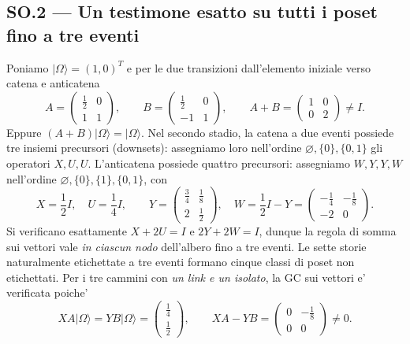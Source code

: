 \documentclass[11pt,a4paper]{article}
\begin{document}
\subsection*{SO.2 --- Un testimone esatto su tutti i poset fino a tre eventi}
Poniamo $|\Omega\rangle=(1,0)^{T}$ e per le due transizioni dall'elemento iniziale verso catena e anticatena
\begin{equation}
A=\begin{pmatrix}\tfrac12&0\\1&1\end{pmatrix},\qquad
B=\begin{pmatrix}\tfrac12&0\\-1&1\end{pmatrix},\qquad
A+B=\begin{pmatrix}1&0\\0&2\end{pmatrix}\ne I.\tag{SO.2}
\end{equation}
Eppure $(A+B)|\Omega\rangle=|\Omega\rangle$. Nel secondo stadio, la catena a due eventi possiede tre insiemi precursori (downsets): assegniamo loro nell'ordine $\varnothing,\{0\},\{0,1\}$ gli operatori $X,U,U$. L'anticatena possiede quattro precursori: assegniamo $W,Y,Y,W$ nell'ordine $\varnothing,\{0\},\{1\},\{0,1\}$, con
\begin{equation}
X=\frac12 I,\quad U=\frac14 I,\qquad
Y=\begin{pmatrix}\tfrac34&\tfrac18\\2&\tfrac12\end{pmatrix},\quad
W=\frac12 I-Y=\begin{pmatrix}-\tfrac14&-\tfrac18\\-2&0\end{pmatrix}.\tag{SO.3}
\end{equation}
Si verificano esattamente $X+2U=I$ e $2Y+2W=I$, dunque la regola di somma sui vettori vale \emph{in ciascun nodo} dell'albero fino a tre eventi. Le sette storie naturalmente etichettate a tre eventi formano cinque classi di poset non etichettati. Per i tre cammini con \emph{un link e un isolato}, la GC sui vettori e' verificata poiche'
\begin{equation}
 XA|\Omega\rangle=YB|\Omega\rangle=
 \begin{pmatrix}\tfrac14\\\tfrac12\end{pmatrix},\qquad
 XA-YB=\begin{pmatrix}0&-\tfrac18\\0&0\end{pmatrix}\ne0.\tag{SO.4}
\end{equation}
\end{document}
